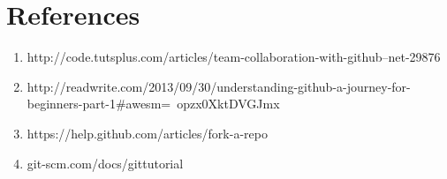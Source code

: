 \documentclass{article} %
\begin{document}
\section{References}

\begin{enumerate}
\item http://code.tutsplus.com/articles/team-collaboration-with-github--net-29876
\item http://readwrite.com/2013/09/30/understanding-github-a-journey-for-beginners-part-1\#awesm=~opzx0XktDVGJmx
\item https://help.github.com/articles/fork-a-repo
\item git-scm.com/docs/gittutorial
\end{enumerate}
\end{document}
